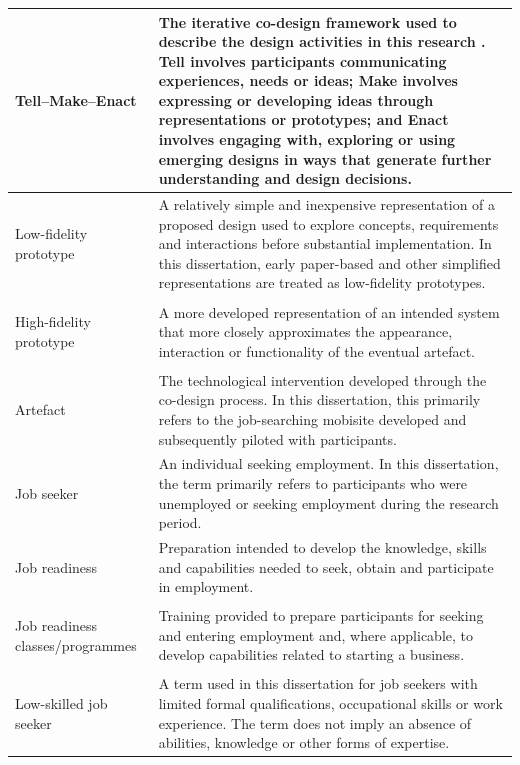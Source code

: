 \begin{longtable}{
    >{\bfseries\raggedright\arraybackslash}p{}
    >{\raggedright\arraybackslash}p{}
}
Tell--Make--Enact &
The iterative co-design framework used to describe the design activities in this research \cite{simonsen2013}. \textbf{Tell} involves participants communicating experiences, needs or ideas; \textbf{Make} involves expressing or developing ideas through representations or prototypes; and \textbf{Enact} involves engaging with, exploring or using emerging designs in ways that generate further understanding and design decisions. \\
\hline

Low-fidelity prototype &
A relatively simple and inexpensive representation of a proposed design used to explore concepts, requirements and interactions before substantial implementation. In this dissertation, early paper-based and other simplified representations are treated as low-fidelity prototypes. \\
\hline

High-fidelity prototype &
A more developed representation of an intended system that more closely approximates the appearance, interaction or functionality of the eventual artefact. \\
\hline

Artefact &
The technological intervention developed through the co-design process. In this dissertation, this primarily refers to the job-searching mobisite developed and subsequently piloted with participants. \\
\hline

Job seeker &
An individual seeking employment. In this dissertation, the term primarily refers to participants who were unemployed or seeking employment during the research period. \\
\hline

Job readiness &
Preparation intended to develop the knowledge, skills and capabilities needed to seek, obtain and participate in employment. \\
\hline

Job readiness classes/programmes &
Training provided to prepare participants for seeking and entering employment and, where applicable, to develop capabilities related to starting a business. \\
\hline

Low-skilled job seeker &
A term used in this dissertation for job seekers with limited formal qualifications, occupational skills or work experience. The term does not imply an absence of abilities, knowledge or other forms of expertise. \\
\hline


\end{longtable}
